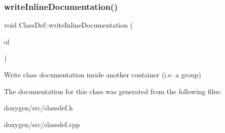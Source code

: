 \subsubsection{\texorpdfstring{writeInlineDocumentation()}{writeInlineDocumentation()}}
{\footnotesize\ttfamily void Class\+Def\+::write\+Inline\+Documentation (\begin{DoxyParamCaption}\item[{\mbox{\hyperlink{class_output_list}{Output\+List}} \&}]{ol }\end{DoxyParamCaption})}

Write class documentation inside another container (i.\+e. a group) 

The documentation for this class was generated from the following files\+:\begin{DoxyCompactItemize}
\item 
doxygen/src/classdef.\+h\item 
doxygen/src/classdef.\+cpp\end{DoxyCompactItemize}
